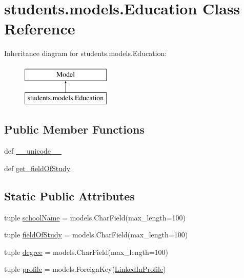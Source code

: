\hypertarget{classstudents_1_1models_1_1_education}{\section{students.\-models.\-Education Class Reference}
\label{classstudents_1_1models_1_1_education}
}
Inheritance diagram for students.\-models.\-Education\-:\begin{figure}[H]
\begin{center}
\leavevmode
\includegraphics[height=2.000000cm]{classstudents_1_1models_1_1_education}
\end{center}
\end{figure}
\subsection*{Public Member Functions}
\begin{DoxyCompactItemize}
\item 
def \hyperlink{classstudents_1_1models_1_1_education_a359443228da9a61334cc9d640292b2c1}{\-\_\-\-\_\-unicode\-\_\-\-\_\-}
\item 
def \hyperlink{classstudents_1_1models_1_1_education_ac93a74960eafbe9ad36545070e2ee866}{get\-\_\-field\-Of\-Study}
\end{DoxyCompactItemize}
\subsection*{Static Public Attributes}
\begin{DoxyCompactItemize}
\item 
tuple \hyperlink{classstudents_1_1models_1_1_education_adf8328e588ab00fd0dc969f45410965d}{school\-Name} = models.\-Char\-Field(max\-\_\-length=100)
\item 
tuple \hyperlink{classstudents_1_1models_1_1_education_acd4a5b8574fb277183cc459776b58ec9}{field\-Of\-Study} = models.\-Char\-Field(max\-\_\-length=100)
\item 
tuple \hyperlink{classstudents_1_1models_1_1_education_a32495524f30233cc0f398a859edfc239}{degree} = models.\-Char\-Field(max\-\_\-length=100)
\item 
tuple \hyperlink{classstudents_1_1models_1_1_education_a7f96253e2068278fe25499989c8dcdbe}{profile} = models.\-Foreign\-Key(\hyperlink{classstudents_1_1models_1_1_linked_in_profile}{Linked\-In\-Profile})
\end{DoxyCompactItemize}



